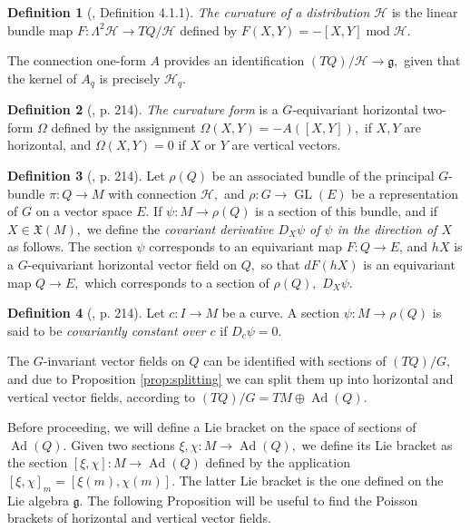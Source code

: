 \documentclass[12pt, letterpaper, reqno]{amsart}
\theoremstyle{definition}
\newtheorem{df}{Definition}
\theoremstyle{plain}
\theoremstyle{remark}
\begin{document}
\begin{df}[\cite{montgomery2002tour}, Definition 4.1.1]
	\textit{The curvature of a distribution $ \mathcal{H} $ } is the linear bundle map $ F: \Lambda^2 \mathcal{H} \rightarrow TQ/\mathcal{H} $ defined by $ F(X,Y) = -[X,Y] \operatorname{mod} \mathcal{H}.  $ 	
\end{df}
The connection one-form $ A $ provides an identification $ (TQ)/ \mathcal{H} \rightarrow \mathfrak{g}, $ given that the kernel of $ A_q $ is precisely $ \mathcal{H}_q. $ 

\begin{df}[\cite{montgomery2002tour}, p. 214]
	\textit{The curvature form} is a $ G $-equivariant horizontal two-form $ \Omega $ defined by the assignment $ \Omega(X,Y) = -A([X,Y]), $ if $ X,Y $ are horizontal, and $ \Omega(X,Y)=0 $ if $ X $ or $ Y$ are vertical vectors.  
\end{df}

\begin{df}[\cite{montgomery2002tour}, p. 214]
	Let $ \rho(Q) $ be an associated bundle of the principal $ G $-bundle $ \pi: Q \rightarrow M $ with connection $ \mathcal{H}, $  and $ \rho:  G \rightarrow \operatorname{GL}(E) $ be a representation of $ G $ on a vector space $ E. $  If $ \psi: M \rightarrow \rho(Q) $ is a section of this bundle, and if $ X\in \mathfrak{X}(M), $ we define the \textit{covariant derivative $ D_X\psi $ of $ \psi $ in the direction of $ X $} as follows. The section $ \psi $ corresponds to an equivariant map $ F: Q \rightarrow E $, and $ hX $ is a $ G $-equivariant horizontal vector field on $ Q, $ so that $ dF(hX) $ is an equivariant map $ Q \rightarrow E, $ which corresponds to a section of $ \rho(Q), $ $ D_X\psi. $ 
\end{df}
\begin{df}[\cite{montgomery2002tour}, p. 214]\label{df:covariantly_constant}
	Let $ c:I \rightarrow M $ be a curve. A section $ \psi: M\rightarrow \rho(Q) $ is said to be \textit{covariantly constant over $ c $} if $ D_{\dot{c}}\psi=0. $  	
\end{df}
The $ G $-invariant vector fields on $ Q $ can be identified with sections of $ (TQ)/G, $ and due to Proposition \ref{prop:splitting} we can split them up into horizontal and vertical vector fields, according to $ (TQ)/G = TM \oplus \operatorname{Ad} (Q). $ 

Before proceeding, we will define a Lie bracket on the space of sections of $ \operatorname{Ad} (Q).$ Given two sections $ \xi,\chi: M \rightarrow \operatorname{Ad} (Q), $ we define its Lie bracket as the section $[\xi, \chi] : M \rightarrow \operatorname{Ad} (Q)$ defined by the application $ [\xi, \chi]_m= [\xi(m), \chi(m)]. $ The latter Lie bracket is the one defined on the Lie algebra $ \mathfrak{g}. $   The following Proposition will be useful to find the Poisson brackets of horizontal and vertical vector fields.
\end{document}
